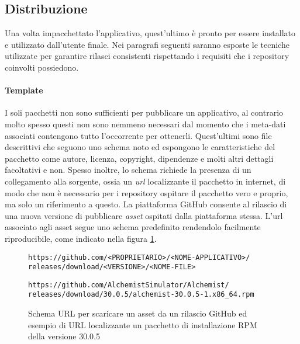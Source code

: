 

\subsection{Distribuzione}

Una volta impacchettato l'applicativo, quest'ultimo è pronto per essere installato e utilizzato dall'utente finale. Nei paragrafi seguenti saranno esposte le tecniche utilizzate per garantire rilasci consistenti rispettando i requisiti che i repository coinvolti possiedono.

\paragraph{Template} I soli pacchetti non sono sufficienti per pubblicare un applicativo, al contrario molto spesso questi non sono nemmeno necessari dal momento che i meta-dati associati contengono tutto l'occorrente per ottenerli. Quest'ultimi sono file descrittivi che seguono uno schema noto ed espongono le caratteristiche del pacchetto come autore, licenza, copyright, dipendenze e molti altri dettagli facoltativi e non. Spesso inoltre, lo schema richiede la presenza di un collegamento alla sorgente, ossia un \textit{url} localizzante il pacchetto in internet, di modo che non è necessario per i repository ospitare il pacchetto vero e proprio, ma solo un riferimento a questo. La piattaforma GitHub consente al rilascio di una nuova versione di pubblicare \textit{asset} ospitati dalla piattaforma stessa. L'url associato agli asset segue uno schema predefinito rendendolo facilmente riproducibile, come indicato nella figura \ref{fig:github-assets-url}.
\begin{figure}[htb]\label{fig:github-assets-url}
	\centering
	\texttt{https://github.com/<PROPRIETARIO>/<NOME-APPLICATIVO>/\\ \tab releases/download/<VERSIONE>/<NOME-FILE>}
	
	\vspace{0.5cm}
	
	\texttt{https://github.com/AlchemistSimulator/Alchemist/\\ \tab releases/download/30.0.5/alchemist-30.0.5-1.x86\_64.rpm}
	\caption{Schema URL per scaricare un asset da un rilascio GitHub ed esempio di URL localizzante un pacchetto di installazione RPM della versione 30.0.5}
\end{figure}

